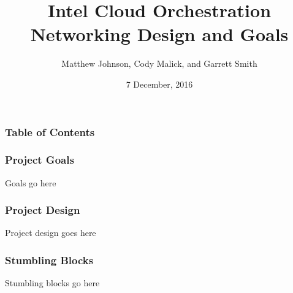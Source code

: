 \documentclass[pdf]{beamer}
\begin{document}
\title{Intel Cloud Orchestration Networking Design and Goals}
\author{Matthew Johnson, Cody Malick, and Garrett Smith}
\date{7 December, 2016}

\maketitle
\begin{frame}
  \frametitle{Table of Contents}
  \tableofcontents
\end{frame}

\begin{frame}
  \frametitle{Project Goals}
  Goals go here
\end{frame}

\begin{frame}
  \frametitle{Project Design}
  Project design goes here
\end{frame}

\begin{frame}
  \frametitle{Stumbling Blocks}
  Stumbling blocks go here
\end{frame}
\end{document}
